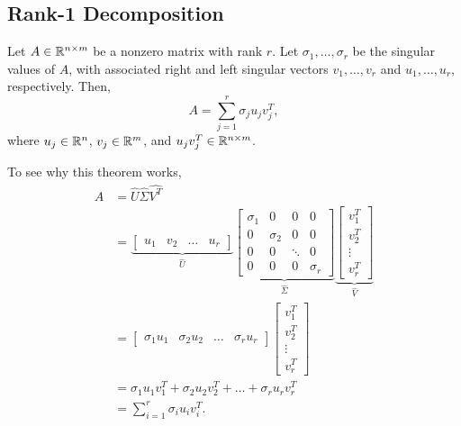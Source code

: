 \documentclass[letterpaper]{article}
\newcommand{\0}{\mathbf{0}}
\begin{document}
\subsection{Rank-1 Decomposition}
\begin{theorem}{}{}
    Let $A \in \mathbb{R}^{n \times m}$ be a nonzero matrix with rank $r$. Let $\sigma_1, \hdots, \sigma_r$ be the singular values of $A$, with associated right and left singular vectors $v_1, \hdots, v_r$ and $u_1, \hdots, u_r$, respectively. Then, 
    \[A = \sum_{j = 1}^{r} \sigma_j u_j v_j^T,\]
    where $u_j \in \mathbb{R}^{n}$, $v_j \in \mathbb{R}^{m}$, and $u_j v_j^T \in \mathbb{R}^{n \times m}$. 
\end{theorem}
To see why this theorem works, 
\begin{equation*}
    \begin{aligned}
        A &= \hat{U}\hat{\Sigma}\hat{V^T} \\ 
            &= \underbrace{\begin{bmatrix}
                u_1 & v_2 & \hdots & u_r
            \end{bmatrix}}_{\hat{U}} \underbrace{\begin{bmatrix}
                \sigma_1 & 0 & 0 & 0 \\ 
                0 & \sigma_2 & 0 & 0 \\ 
                0 & 0 & \ddots & 0 \\ 
                0 & 0 & 0 & \sigma_r
            \end{bmatrix}}_{\hat{\Sigma}} \underbrace{\begin{bmatrix}
                v_1^T \\ v_2^T \\ \vdots \\ v_r^T
            \end{bmatrix}}_{\hat{V}} \\ 
            &= \begin{bmatrix}
                \sigma_1 u_1 & \sigma_2 u_2 & \hdots & \sigma_r u_r
            \end{bmatrix} \begin{bmatrix}
                v_1^T \\ v_2^T \\ \vdots \\ v_r^T
            \end{bmatrix} \\ 
            &= \sigma_1 u_1 v_1^T + \sigma_2 u_2 v_2^T + \hdots + \sigma_r u_r v_r^T \\ 
            &= \sum_{i = 1}^{r} \sigma_i u_i v_{i}^T.
    \end{aligned}
\end{equation*}
\end{document}
